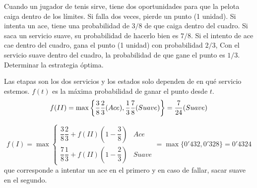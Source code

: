 \documentclass[twoside]{article}
\begin{document}
\newpage
\begin{ejercicio}{8} 
Cuando un jugador de tenis sirve, tiene dos oportunidades para que la pelota caiga dentro de los límites. Si falla dos veces, pierde un punto (1 unidad). Si intenta un ace, tiene una probabilidad de $3/8$ de que caiga dentro del cuadro. Si saca un servicio suave, su probabilidad de hacerlo bien es $7/8$. Si el intento de ace cae dentro del cuadro, gana el punto (1 unidad) con probabilidad $2/3$, Con el servicio suave dentro del cuadro, la probabilidad de que gane el punto es $1/3$. Determinar la estrategia óptima.
\end{ejercicio}
\begin{solucion}
Las etapas son los dos servicios y los estados solo dependen de en qué servicio estemos. $f(t)$ es la máxima probabilidad de ganar el punto desde $t$. 
$$f(II)=
\max_{}{\left\{\frac{3}{8}\frac{2}{3} (Ace),\frac{1}{3}\frac{7}{8}(Suave)\right\}}=\frac{7}{24}(Suave)
$$

$$f(I)=\max\begin{cases}
\dfrac{3}{8}\dfrac{2}{3}+f(II)\left(1-\dfrac{3}{8}\right) & Ace\\
\dfrac{7}{8}\dfrac{1}{3}+f(II)\left(1-\dfrac{2}{3}\right) & Suave
\end{cases}=\max\{0'432,0'328\}=0'4324$$ que corresponde a intentar un ace en el primero y en caso de fallar, sacar suave en el segundo.
\end{solucion}


\newpage
\end{document}
